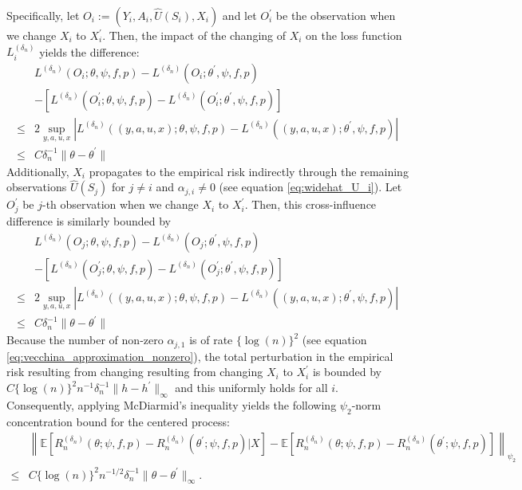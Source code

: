 \documentclass[12pt]{article}
\newcommand{\E}{\mathbb{E}}
\begin{document}
Specifically, let $O_i:=(Y_i,A_i,\widehat U(S_i),X_i)$ and let $O_i^\prime$ be the observation when we change $X_i$ to $X_i^\prime$. Then, the impact of the changing of $X_i$ on the loss function $L_i^{(\delta_n)}$ yields the difference:
\begin{align*}
&L^{(\delta_n)}(O_i;\theta,\psi,f,p) - L^{(\delta_n)}(O_i;\theta^\prime,\psi,f,p)\\
        & -\left[L^{(\delta_n)}(O_i^\prime;\theta,\psi,f,p) - L^{(\delta_n)}(O_i^\prime;\theta^\prime,\psi,f,p)\right]\\
        \leq  & 2\sup_{y,a,u,x}\left|L^{(\delta_n)}((y,a,u,x);\theta,\psi,f,p) - L^{(\delta_n)}((y,a,u,x);\theta^\prime,\psi,f,p)\right|\\
        \leq & C\delta_n^{-1}\|\theta-\theta^\prime\|
\end{align*}
Additionally, $X_i$ propagates to the empirical risk indirectly through the remaining observations $\widehat U(S_j)$ for $j\neq i$ and $\alpha_{j,i}\neq 0$ (see equation \eqref{eq:widehat_U_i}). Let $O_j^\prime$ be $j$-th observation when we change $X_i$ to $X_i^\prime$. Then, this cross-influence difference is similarly bounded by 
\begin{align*}
&L^{(\delta_n)}(O_j;\theta,\psi,f,p) - L^{(\delta_n)}(O_j;\theta^\prime,\psi,f,p)\\
        & -\left[L^{(\delta_n)}(O_j^\prime;\theta,\psi,f,p) - L^{(\delta_n)}(O_j^\prime;\theta^\prime,\psi,f,p)\right]\\
        \leq  & 2\sup_{y,a,u,x}\left|L^{(\delta_n)}((y,a,u,x);\theta,\psi,f,p) - L^{(\delta_n)}((y,a,u,x);\theta^\prime,\psi,f,p)\right|\\
        \leq & C\delta_n^{-1}\|\theta-\theta^\prime\|
\end{align*}
Because the number of non-zero $\alpha_{j,1}$ is of rate $\{\log(n)\}^2$ (see equation \eqref{eq:vecchina_approximation_nonzero}), the total perturbation in the empirical risk resulting from changing resulting from changing $X_i$ to $X_i^\prime$ is bounded by $C\{\log(n)\}^2 n^{-1}\delta_n^{-1}\|h - h^\prime\|_{\infty}$ and this uniformly holds for all $i$. Consequently, applying McDiarmid's inequality yields the following $\psi_2$-norm concentration bound for the centered process:
\begin{align*}
    &\left\|\E\left[R_n^{(\delta_n)}(\theta;\psi,f,p)-R_n^{({\delta_n})}(\theta^\prime;\psi,f,p)|X\right]-\E\left[R_n^{(\delta_n)}(\theta;\psi,f,p)-R_n^{({\delta_n})}(\theta^\prime;\psi,f,p)\right]\right\|_{\psi_2}\\
    \leq & C\{\log(n)\}^2 n^{-1/2}\delta_n^{-1}\|\theta - \theta^\prime\|_{\infty}.
\end{align*}
\end{document}
